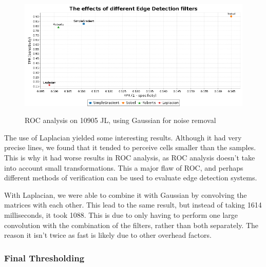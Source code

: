 \documentclass[10pt,a4paper]{article}
\begin{document}
\begin{figure}[h]
\centering
\includegraphics[scale=0.5]{graphs/1-edge_detect_all.png}
\label{fig:figure2}
\caption{ROC analysis on 10905 JL, using Gaussian for noise removal}
\end{figure}

The use of Laplacian yielded some interesting results. Although it had very precise lines, we found that it tended to perceive cells smaller than the samples. This is why it had worse results in ROC analysis, as ROC analysis doesn’t take into account small transformations. This a major flaw of ROC, and perhaps different methods of verification can be used to evaluate edge detection systems.

With Laplacian, we were able to combine it with Gaussian by convolving the matrices with each other. This lead to the same result, but instead of taking 1614 milliseconds, it took 1088. This is due to only having to perform one large convolution with the combination of the filters, rather than both separately. The reason it isn’t twice as fast is likely due to other overhead factors.

\subsubsection*{Final Thresholding}
\end{document}
